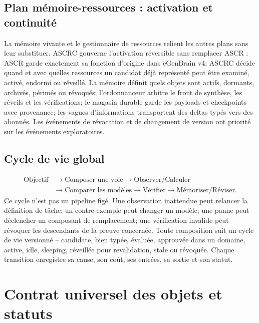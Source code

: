 \documentclass[11pt,a4paper]{article}
\begin{document}
\subsection{Plan mémoire-ressources : activation et continuité}
La mémoire vivante et le gestionnaire de ressources relient les autres plans sans leur substituer. ASCRC gouverne l’activation réversible sans remplacer ASCR : ASCR garde exactement sa fonction d’origine dans eGenBrain v4; ASCRC décide quand et avec quelles ressources un candidat déjà représenté peut être examiné, activé, endormi ou réveillé. La mémoire définit quels objets sont actifs, dormants, archivés, périmés ou révoqués; l'ordonnanceur arbitre le front de synthèse, les réveils et les vérifications; le magasin durable garde les payloads et checkpoints avec provenance; les vagues d'informations transportent des deltas typés vers des abonnés. Les événements de révocation et de changement de version ont priorité sur les événements exploratoires.

\subsection{Cycle de vie global}
\[
\begin{aligned}
\text{Objectif} &\to \text{Composer une voie} \to \text{Observer/Calculer}\\
&\to \text{Comparer les modèles} \to \text{Vérifier} \to \text{Mémoriser/Réviser}.
\end{aligned}
\]
Ce cycle n'est pas un pipeline figé. Une observation inattendue peut relancer la définition de tâche; un contre-exemple peut changer un modèle; une panne peut déclencher un composant de remplacement; une vérification invalide peut révoquer les descendants de la preuve concernée. Toute composition suit un cycle de vie versionné -- candidate, bien typée, évaluée, approuvée dans un domaine, active, idle, sleeping, réveillée pour revalidation, stale ou révoquée. Chaque transition enregistre sa cause, son coût, ses entrées, sa sortie et son statut.

\section{Contrat universel des objets et statuts}
\end{document}
